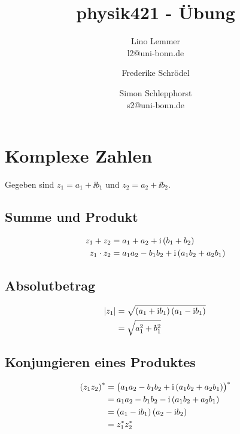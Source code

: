 

\setcounter{thezettel}{1}
\renewcommand\thesection{\arabic{thezettel}.\arabic{section}}

\title{physik421 - Übung }
\author{Lino Lemmer \\ \small{l2@uni-bonn.de} \and Frederike Schrödel \and Simon Schlepphorst\\ 
 \small{s2@uni-bonn.de}}


\maketitle

\section{Komplexe Zahlen}

Gegeben sind $z_1 = a_1 + \ii b_1$ und $z_2 = a_2 + \ii b_2$.

\subsection{Summe und Produkt}

\begin{align*}
    z_1 + z_2 &= a_1 + a_2 + \ii\del{b_1 + b_2} \\
    z_1 \cdot z_2 &= a_1a_2 - b_1b_2 + \ii\del{a_1b_2+a_2b_1}
\end{align*}

\subsection{Absolutbetrag}

\begin{align*}
    \abs{z_1} &= \sqrt{\del{a_1 + \ii b_1}\del{a_1 - \ii b_1}} \\
              &= \sqrt{a_1^2 + b_1^2}
\end{align*}

\subsection{Konjungieren eines Produktes}

\begin{align*}
    \del{z_1z_2}^* &= \del{a_1a_2 - b_1b_2 + \ii\del{a_1b_2 + a_2b_1}}^* \\
                   &= a_1a_2 - b_1b_2 - \ii\del{a_1b_2 + a_2b_1} \\
                   &= \del{a_1 - \ii b_1}\del{a_2 - \ii b_2} \\
                   &= z_1^* z_2^*
\end{align*}

